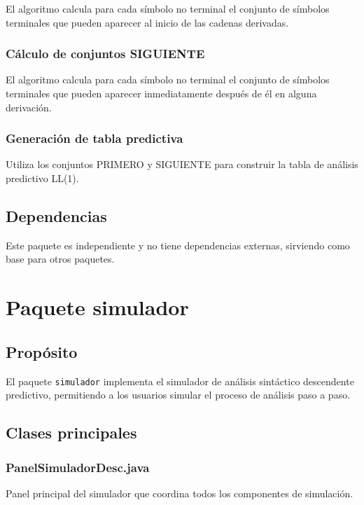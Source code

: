 El algoritmo calcula para cada símbolo no terminal el conjunto de símbolos terminales que pueden aparecer al inicio de las cadenas derivadas.

\subsubsection{Cálculo de conjuntos SIGUIENTE}

El algoritmo calcula para cada símbolo no terminal el conjunto de símbolos terminales que pueden aparecer inmediatamente después de él en alguna derivación.

\subsubsection{Generación de tabla predictiva}

Utiliza los conjuntos PRIMERO y SIGUIENTE para construir la tabla de análisis predictivo LL(1).

\subsection{Dependencias}

Este paquete es independiente y no tiene dependencias externas, sirviendo como base para otros paquetes.

\section{Paquete simulador}

\subsection{Propósito}

El paquete \texttt{simulador} implementa el simulador de análisis sintáctico descendente predictivo, permitiendo a los usuarios simular el proceso de análisis paso a paso.

\subsection{Clases principales}

\subsubsection{PanelSimuladorDesc.java}

Panel principal del simulador que coordina todos los componentes de simulación.

